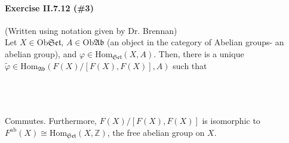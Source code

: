 \documentclass[12pt,letterpaper]{article}
\begin{document}
\pagebreak
\paragraph{Exercise II.7.12 (\#3)} (Written using notation given by Dr. Brennan)\\ 
Let $X \in \mathrm{Ob }\mathfrak{Set}$, $A \in \mathrm{Ob }\mathfrak{Ab}$ (an object in the category of Abelian groups- an abelian group), and $\varphi \in \mathrm{Hom}_{\mathfrak{Set}}(X,A)$. Then, there is a unique $\tilde\varphi \in \mathrm{Hom}_{\mathfrak{Ab}}(F(X)/[F(X),F(X)], A)$ such that\\\\
		\\\\
	Commutes. Furthermore, $F(X)/[F(X),F(X)]$ is isomorphic to $F^\text{ab}(X) \cong \mathrm{Hom}_{\mathfrak{Set}}(X,\mathbb{Z})$, the free abelian group on $X$.
\end{document}

